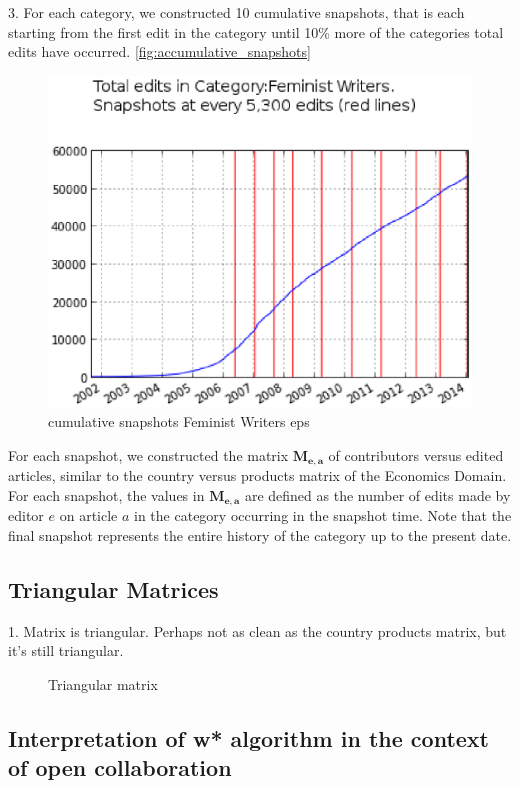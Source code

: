\documentclass{acm_proc_article-sp}
\begin{document}
3. For each category, we constructed 10 cumulative snapshots, that is each starting from the first edit in the category until 10\% more of the categories total edits have occurred. \ref{fig:accumulative_snapshots}

\begin{figure}[!t]
\centering
\includegraphics[width=0.9\columnwidth]{Figures/cumulative_snapshots_Feminist_Writers.eps}
\caption{cumulative snapshots Feminist Writers eps }
\label{fig:figure1}
\end{figure}


For each snapshot, we constructed the matrix $\mathbf{M_{e,a}}$ of contributors versus edited articles, similar to the country versus products matrix of the Economics Domain. For each snapshot, the values in $\mathbf{M_{e,a}}$ are defined as the number of edits made by editor $e$ on article $a$ in the category occurring in the snapshot time. Note that the final snapshot represents the entire history of the category up to the present date. 

\subsection{Triangular Matrices}
1. Matrix is triangular.
Perhaps not as clean as the country products matrix, but it's still triangular.

\begin{figure}[!t]
\centering
\caption{Triangular matrix}
\label{fig:triangle_matrix}
\end{figure}

\subsection{Interpretation of w* algorithm in the context of open collaboration}
\end{document}
